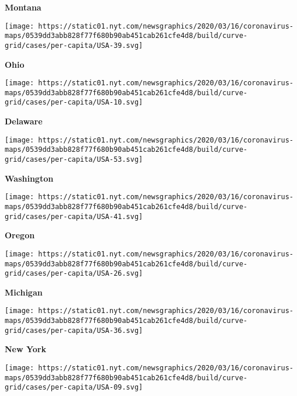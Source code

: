 \textbf{Montana}

\href{https://www.nytimes.com/interactive/2020/us/ohio-coronavirus-cases.html}{}

\texttt{[image: https://static01.nyt.com/newsgraphics/2020/03/16/coronavirus-maps/0539dd3abb828f77f680b90ab451cab261cfe4d8/build/curve-grid/cases/per-capita/USA-39.svg]}

\textbf{Ohio}

\href{https://www.nytimes.com/interactive/2020/us/delaware-coronavirus-cases.html}{}

\texttt{[image: https://static01.nyt.com/newsgraphics/2020/03/16/coronavirus-maps/0539dd3abb828f77f680b90ab451cab261cfe4d8/build/curve-grid/cases/per-capita/USA-10.svg]}

\textbf{Delaware}

\href{https://www.nytimes.com/interactive/2020/us/washington-coronavirus-cases.html}{}

\texttt{[image: https://static01.nyt.com/newsgraphics/2020/03/16/coronavirus-maps/0539dd3abb828f77f680b90ab451cab261cfe4d8/build/curve-grid/cases/per-capita/USA-53.svg]}

\textbf{Washington}

\href{https://www.nytimes.com/interactive/2020/us/oregon-coronavirus-cases.html}{}

\texttt{[image: https://static01.nyt.com/newsgraphics/2020/03/16/coronavirus-maps/0539dd3abb828f77f680b90ab451cab261cfe4d8/build/curve-grid/cases/per-capita/USA-41.svg]}

\textbf{Oregon}

\href{https://www.nytimes.com/interactive/2020/us/michigan-coronavirus-cases.html}{}

\texttt{[image: https://static01.nyt.com/newsgraphics/2020/03/16/coronavirus-maps/0539dd3abb828f77f680b90ab451cab261cfe4d8/build/curve-grid/cases/per-capita/USA-26.svg]}

\textbf{Michigan}

\href{https://www.nytimes.com/interactive/2020/us/new-york-coronavirus-cases.html}{}

\texttt{[image: https://static01.nyt.com/newsgraphics/2020/03/16/coronavirus-maps/0539dd3abb828f77f680b90ab451cab261cfe4d8/build/curve-grid/cases/per-capita/USA-36.svg]}

\textbf{New York}

\href{https://www.nytimes.com/interactive/2020/us/connecticut-coronavirus-cases.html}{}

\texttt{[image: https://static01.nyt.com/newsgraphics/2020/03/16/coronavirus-maps/0539dd3abb828f77f680b90ab451cab261cfe4d8/build/curve-grid/cases/per-capita/USA-09.svg]}

